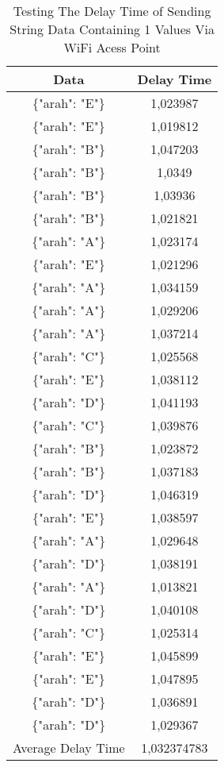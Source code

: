 \begin{table}[!ht]
  \centering
  \caption{Testing The Delay Time of Sending String Data Containing 1 Values Via WiFi Acess Point}
  \label{tbl:delayWiFiJSON1}
  \begin{tabular}{|c|c|}
  \hline
  Data               & Delay Time  \\ \hline
  \{"arah": "E"\}    & 1,023987    \\ \hline
  \{"arah": "E"\}    & 1,019812    \\ \hline
  \{"arah": "B"\}    & 1,047203    \\ \hline
  \{"arah": "B"\}    & 1,0349      \\ \hline
  \{"arah": "B"\}    & 1,03936     \\ \hline
  \{"arah": "B"\}    & 1,021821    \\ \hline
  \{"arah": "A"\}    & 1,023174    \\ \hline
  \{"arah": "E"\}    & 1,021296    \\ \hline
  \{"arah": "A"\}    & 1,034159    \\ \hline
  \{"arah": "A"\}    & 1,029206    \\ \hline
  \{"arah": "A"\}    & 1,037214    \\ \hline
  \{"arah": "C"\}    & 1,025568    \\ \hline
  \{"arah": "E"\}    & 1,038112    \\ \hline
  \{"arah": "D"\}    & 1,041193    \\ \hline
  \{"arah": "C"\}    & 1,039876    \\ \hline
  \{"arah": "B"\}    & 1,023872    \\ \hline
  \{"arah": "B"\}    & 1,037183    \\ \hline
  \{"arah": "D"\}    & 1,046319    \\ \hline
  \{"arah": "E"\}    & 1,038597    \\ \hline
  \{"arah": "A"\}    & 1,029648    \\ \hline
  \{"arah": "D"\}    & 1,038191    \\ \hline
  \{"arah": "A"\}    & 1,013821    \\ \hline
  \{"arah": "D"\}    & 1,040108    \\ \hline
  \{"arah": "C"\}    & 1,025314    \\ \hline
  \{"arah": "E"\}    & 1,045899    \\ \hline
  \{"arah": "E"\}    & 1,047895    \\ \hline
  \{"arah": "D"\}    & 1,036891    \\ \hline
  \{"arah": "D"\}    & 1,029367    \\ \hline
  Average Delay Time & 1,032374783 \\ \hline
  \end{tabular}
  \end{table}

